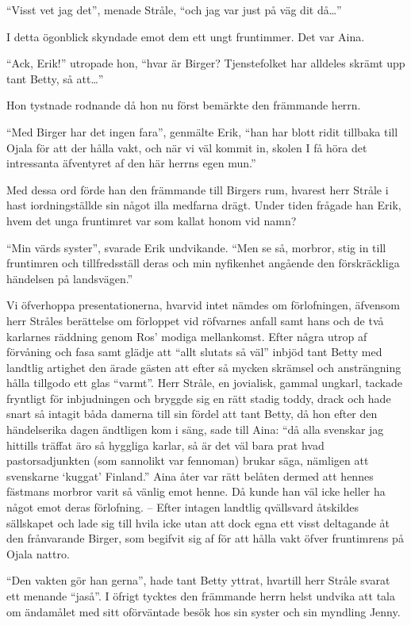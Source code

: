 ``Visst vet jag det'', menade Stråle, ``och jag var just på väg dit
då\ldots{}''

I detta ögonblick skyndade emot dem ett ungt fruntimmer. Det var Aina.

``Ack, Erik!'' utropade hon, ``hvar är Birger? Tjenstefolket har
alldeles skrämt upp tant Betty, så att\ldots{}''

Hon tystnade rodnande då hon nu först bemärkte den främmande herrn.

``Med Birger har det ingen fara'', genmälte Erik, ``han har blott ridit
tillbaka till Ojala för att der hålla vakt, och när vi väl kommit in,
skolen I få höra det intressanta äfventyret af den här herrns egen
mun.''

Med dessa ord förde han den främmande till Birgers rum, hvarest herr
Stråle i hast iordningställde sin något illa medfarna drägt. Under tiden
frågade han Erik, hvem det unga fruntimret var som kallat honom vid
namn?

``Min värds syster'', svarade Erik undvikande. ``Men se så, morbror,
stig in till fruntimren och tillfredsställ deras och min nyfikenhet
angående den förskräckliga händelsen på landsvägen.''

Vi öfverhoppa presentationerna, hvarvid intet nämdes om förlofningen,
äfvensom herr Stråles berättelse om förloppet vid röfvarnes anfall samt
hans och de två karlarnes räddning genom Ros' modiga mellankomst. Efter
några utrop af förvåning och fasa samt glädje att ``allt slutats så
väl'' inbjöd tant Betty med landtlig artighet den ärade gästen att efter
så mycken skrämsel och ansträngning hålla tillgodo ett glas ``varmt''.
Herr Stråle, en jovialisk, gammal ungkarl, tackade fryntligt för
inbjudningen och bryggde sig en rätt stadig toddy, drack och hade snart
så intagit båda damerna till sin fördel att tant Betty, då hon efter den
händelserika dagen ändtligen kom i säng, sade till Aina: ``då alla
svenskar jag hittills träffat äro så hyggliga karlar, så är det väl bara
prat hvad pastorsadjunkten (som sannolikt var fennoman) brukar säga,
nämligen att svenskarne `kuggat' Finland.'' Aina åter var rätt belåten
dermed att hennes fästmans morbror varit så vänlig emot henne. Då kunde
han väl icke heller ha något emot deras förlofning. -- Efter intagen
landtlig qvällsvard åtskildes sällskapet och lade sig till hvila icke
utan att dock egna ett visst deltagande åt den frånvarande Birger, som
begifvit sig af för att hålla vakt öfver fruntimrens på Ojala nattro.

``Den vakten gör han gerna'', hade tant Betty yttrat, hvartill herr
Stråle svarat ett menande ``jaså''. I öfrigt tycktes den främmande herrn
helst undvika att tala om ändamålet med sitt oförväntade besök hos sin
syster och sin myndling Jenny.

